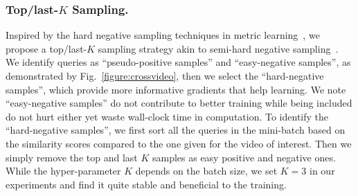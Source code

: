 \subsubsection{Top/last-$K$ Sampling.}
Inspired by the hard negative sampling techniques in metric learning~\citep{shrivastava2016training,lin2017focal,liu2016ssd,zhang2017range}, 
we propose a top/last-$K$ sampling strategy akin to semi-hard negative sampling~\citep{schroff2015facenet}. 
We identify queries as ``pseudo-positive samples'' and ``easy-negative samples'', 
as demonstrated by Fig.~\ref{figure:crossvideo},
then we select the ``hard-negative samples'',
which provide more informative gradients that help learning.
We note ``easy-negative samples'' do not contribute to better training while being included do not hurt either yet
waste wall-clock time in computation.
To identify the ``hard-negative samples'', 
we first sort all the queries in the mini-batch based on 
the similarity scores
compared to the one given for the video of interest.
Then we simply remove the top and last $K$ samples as easy positive and negative ones.
While the hyper-parameter $K$ depends on the batch size,
we set $K=3$ in our experiments and find it quite 
stable and beneficial to the training.
 
